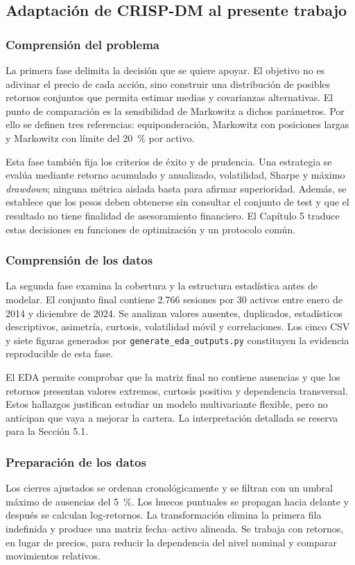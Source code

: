 \subsection{Adaptación de CRISP-DM al presente trabajo}

\subsubsection{Comprensión del problema}
La primera fase delimita la decisión que se quiere apoyar. El objetivo no es adivinar el precio de cada acción, sino construir una distribución de posibles retornos conjuntos que permita estimar medias y covarianzas alternativas. El punto de comparación es la sensibilidad de Markowitz a dichos parámetros. Por ello se definen tres referencias: equiponderación, Markowitz con posiciones largas y Markowitz con límite del 20~\% por activo.

Esta fase también fija los criterios de éxito y de prudencia. Una estrategia se evalúa mediante retorno acumulado y anualizado, volatilidad, Sharpe y máximo \textit{drawdown}; ninguna métrica aislada basta para afirmar superioridad. Además, se establece que los pesos deben obtenerse sin consultar el conjunto de test y que el resultado no tiene finalidad de asesoramiento financiero. El Capítulo 5 traduce estas decisiones en funciones de optimización y un protocolo común.

\subsubsection{Comprensión de los datos}
La segunda fase examina la cobertura y la estructura estadística antes de modelar. El conjunto final contiene 2.766 sesiones por 30 activos entre enero de 2014 y diciembre de 2024. Se analizan valores ausentes, duplicados, estadísticos descriptivos, asimetría, curtosis, volatilidad móvil y correlaciones. Los cinco CSV y siete figuras generados por \texttt{generate\_eda\_outputs.py} constituyen la evidencia reproducible de esta fase.

El EDA permite comprobar que la matriz final no contiene ausencias y que los retornos presentan valores extremos, curtosis positiva y dependencia transversal. Estos hallazgos justifican estudiar un modelo multivariante flexible, pero no anticipan que vaya a mejorar la cartera. La interpretación detallada se reserva para la Sección 5.1.

\subsubsection{Preparación de los datos}
Los cierres ajustados se ordenan cronológicamente y se filtran con un umbral máximo de ausencias del 5~\%. Los huecos puntuales se propagan hacia delante y después se calculan log-retornos. La transformación elimina la primera fila indefinida y produce una matriz fecha--activo alineada. Se trabaja con retornos, en lugar de precios, para reducir la dependencia del nivel nominal y comparar movimientos relativos.

